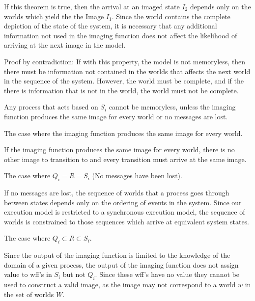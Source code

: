 If this theorem is true, then the arrival at an imaged state $I_2$ depends only on the worlds which yield the the Image $I_1$. Since the world contains the complete depiction of the state of the system, it is necessary that any additional information not used in the imaging function does not affect the likelihood of arriving at the next image in the model.

Proof by contradiction: If with this property, the model is not memoryless, then there must be information not contained in the worlds that affects the next world in the sequence of the system. However, the world must be complete, and if the there is information that is not in the world, the world must not be complete.

\begin{thm}
Any process that acts based on $S_i$ cannot be memoryless, unless the imaging function produces the same image for every world or no messages are lost.
\end{thm}

\begin{case}
The case where the imaging function produces the same image for every world.
\end{case}

If the imaging function produces the same image for every world, there is no other image to transition to and every transition must arrive at the same image.

\begin{case}
The case where $Q_i = R = S_i$ (No messages have been lost).
\end{case}

If no messages are lost, the sequence of worlds that a process goes through between states depends only on the ordering of events in the system. Since our execution model is restricted to a synchronous execution model, the sequence of worlds is constrained to those sequences which arrive at equivalent system states.

\begin{case}
The case where $Q_i \subset R \subset S_i$.
\end{case}

Since the output of the imaging function is limited to the knowledge of the domain of a given process, the output of the imaging function does not assign value to wff's in $S_i$ but not $Q_i$. Since these wff's have no value they cannot be used to construct a valid image, as the image may not correspond to a world $w$ in the set of worlds $W$.


